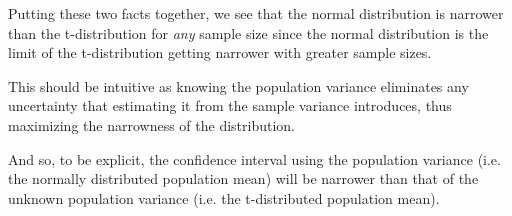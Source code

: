 \documentclass{article}
\begin{document}
Putting these two facts together, we see that the normal distribution is narrower than the t-distribution for \textit{any} sample size since the normal distribution is the limit of the t-distribution getting narrower with greater sample sizes.

This should be intuitive as knowing the population variance eliminates any uncertainty that estimating it from the sample variance introduces, thus maximizing the narrowness of the distribution.

And so, to be explicit, the confidence interval using the population variance (i.e. the normally distributed population mean) will be narrower than that of the unknown population variance (i.e. the t-distributed population mean).
\end{document}
